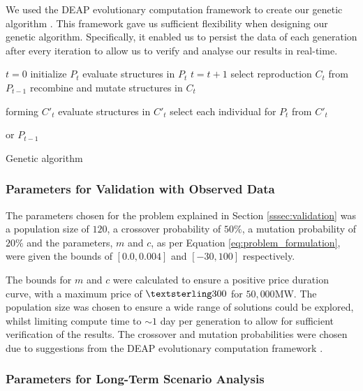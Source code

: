 We used the DEAP evolutionary computation framework to create our genetic algorithm \cite{Gagn2012}. This framework gave us sufficient flexibility when designing our genetic algorithm. Specifically, it enabled us to persist the data of each generation after every iteration to allow us to verify and analyse our results in real-time.

%
\begin{algorithm}[t]
	\begin{algorithmic}[1]
		\State $t=0$
		\State initialize $P_{t}$
		\State evaluate structures in $P_{t}$
		\State $t=t+1$
		\State select reproduction $C_{t}$ from $P_{t-1}$
		\State recombine and mutate structures in $C_{t}$
		
		forming $C'_{t}$
		\State evaluate structures in $C'_{t}$
		\State select each individual for $P_{t}$ from $C'_{t}$ 
		
		or $P_{t-1}$
		\EndWhile
		\caption{Genetic algorithm \cite{FogelDavidB2009}}
		\label{genetic-algorithm}
	\end{algorithmic}
\end{algorithm}

\subsubsection{Parameters for Validation with Observed Data}
\label{ssec:ga_params_valid}

The parameters chosen for the problem explained in Section \ref{sssec:validation} was a population size of $120$, a crossover probability of $50\%$, a mutation probability of $20\%$ and the parameters, $m$ and $c$, as per Equation \ref{eq:problem_formulation}, were given the bounds of $[0.0, 0.004]$ and $[-30, 100]$ respectively. 

The bounds for $m$ and $c$ were calculated to ensure a positive price duration curve, with a maximum price of $\textsterling300$ for $50,000$MW. The population size was chosen to ensure a wide range of solutions could be explored, whilst limiting compute time to ${\sim}1$ day per generation to allow for sufficient verification of the results. The crossover and mutation probabilities were chosen due to suggestions from the DEAP evolutionary computation framework \cite{Gagn2012}.


\subsubsection{Parameters for Long-Term Scenario Analysis}

